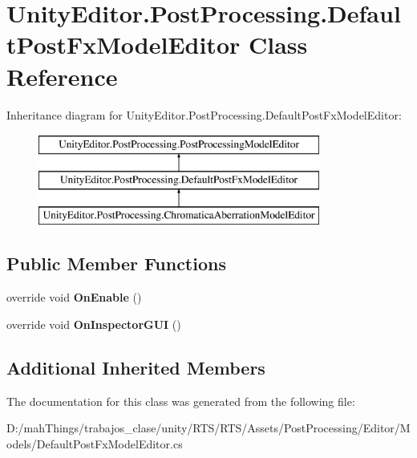 \hypertarget{class_unity_editor_1_1_post_processing_1_1_default_post_fx_model_editor}{}\section{Unity\+Editor.\+Post\+Processing.\+Default\+Post\+Fx\+Model\+Editor Class Reference}
\label{class_unity_editor_1_1_post_processing_1_1_default_post_fx_model_editor}
Inheritance diagram for Unity\+Editor.\+Post\+Processing.\+Default\+Post\+Fx\+Model\+Editor\+:\begin{figure}[H]
\begin{center}
\leavevmode
\includegraphics[height=3.000000cm]{class_unity_editor_1_1_post_processing_1_1_default_post_fx_model_editor}
\end{center}
\end{figure}
\subsection*{Public Member Functions}
\begin{DoxyCompactItemize}
\item 
\mbox{\label{class_unity_editor_1_1_post_processing_1_1_default_post_fx_model_editor_a68eb49101de308934dcd63dbe26b4704}} 
override void {\bfseries On\+Enable} ()
\item 
\mbox{\label{class_unity_editor_1_1_post_processing_1_1_default_post_fx_model_editor_a2f43028e13c460b608aab5c846551016}} 
override void {\bfseries On\+Inspector\+G\+UI} ()
\end{DoxyCompactItemize}
\subsection*{Additional Inherited Members}


The documentation for this class was generated from the following file\+:\begin{DoxyCompactItemize}
\item 
D\+:/mah\+Things/trabajos\+\_\+clase/unity/\+R\+T\+S/\+R\+T\+S/\+Assets/\+Post\+Processing/\+Editor/\+Models/Default\+Post\+Fx\+Model\+Editor.\+cs\end{DoxyCompactItemize}
